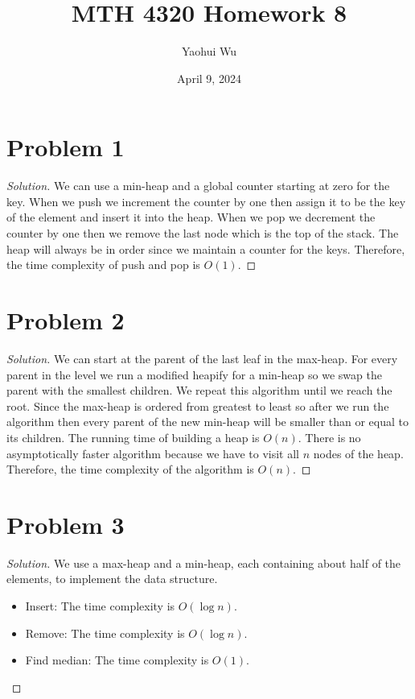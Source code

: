 \documentclass[12pt]{article}
\title{MTH 4320 Homework 8}
\author{Yaohui Wu}
\date{April 9, 2024}
\newenvironment*{solution}{\begin{proof}[Solution]}{\end{proof}}
\begin{document}
\maketitle
\section*{Problem 1}
\begin{solution}
    We can use a min-heap and a global counter starting at zero for the key.
    When we push we increment the counter by one then assign it to be the key
    of the element and insert it into the heap. When we pop we decrement the
    counter by one then we remove the last node which is the top of the stack.
    The heap will always be in order since we maintain a counter for the keys.
    Therefore, the time complexity of push and pop is \(O(1)\).
\end{solution}
\section*{Problem 2}
\begin{solution}
    We can start at the parent of the last leaf in the max-heap. For every
    parent in the level we run a modified heapify for a min-heap so we swap
    the parent with the smallest children. We repeat this algorithm until we
    reach the root. Since the max-heap is ordered from greatest to least so
    after we run the algorithm then every parent of the new min-heap will be
    smaller than or equal to its children. The running time of building a heap
    is \(O(n)\). There is no asymptotically faster algorithm because we have
    to visit all \(n\) nodes of the heap. Therefore, the time complexity of
    the algorithm is \(O(n)\).
\end{solution}
\section*{Problem 3}
\begin{solution}
    We use a max-heap and a min-heap, each containing about half of the
    elements, to implement the data structure.
    \begin{itemize}
        \item Insert: The time complexity is \(O(\log n)\).
        \item Remove: The time complexity is \(O(\log n)\).
        \item Find median: The time complexity is \(O(1)\).
    \end{itemize}
\end{solution}
\end{document}
